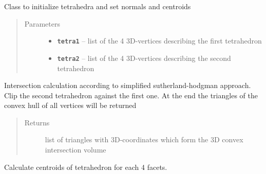 \documentclass[letterpaper,10pt,english]{sphinxmanual}
\begin{document}

\begin{fulllineitems}
\label{pk_src.intersection_tet_tet:pk_src.intersection_tet_tet.intersection_tet_tet}
Class to initialize tetrahedra and set normals and centroids
\begin{quote}\begin{description}
\item[{Parameters}] \leavevmode\begin{itemize}
\item {} 
\textbf{\texttt{tetra1}} -- list of the 4 3D-vertices describing the first tetrahedron

\item {} 
\textbf{\texttt{tetra2}} -- list of the 4 3D-vertices describing the second tetrahedron

\end{itemize}

\end{description}\end{quote}

\begin{fulllineitems}
\label{pk_src.intersection_tet_tet:pk_src.intersection_tet_tet.intersection_tet_tet.intersect}
Intersection calculation according to simplified sutherland-hodgman approach. Clip the second tetrahedron against the first one. At the end the triangles of the convex hull of all vertices will be returned
\begin{quote}\begin{description}
\item[{Returns}] \leavevmode
list of triangles with 3D-coordinates which form the 3D convex intersection volume

\end{description}\end{quote}

\end{fulllineitems}


\begin{fulllineitems}
\label{pk_src.intersection_tet_tet:pk_src.intersection_tet_tet.intersection_tet_tet.setCentroid}
Calculate centroids of tetrahedron for each 4 facets.


\end{fulllineitems}
\end{fulllineitems}
\end{document}
